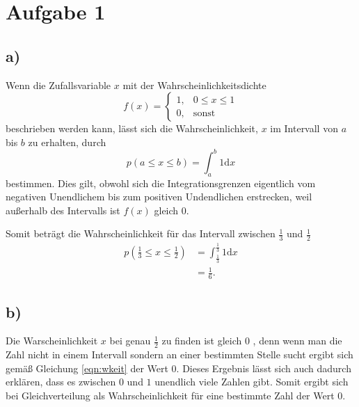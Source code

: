 \newpage
\section{Aufgabe 1}
\label{sec:a1}

\subsection{a)}
\label{subsec:a1a}
Wenn die Zufallsvariable $x$ mit der Wahrscheinlichkeitsdichte
\\
\begin{equation}
  \label{eqn:dichte}
  f\left( x \right) =
  \begin{cases}
     1 , & 0 \le x \le 1 \\
     0 , & \text{sonst}
  \end{cases}
\end{equation}
beschrieben werden kann, lässt sich die Wahrscheinlichkeit, $x$ im Intervall von $a$
bis $b$ zu erhalten, durch
\\
\begin{equation}
  \label{eqn:wkeit}
  p\left( a \le x \le b \right) = \int_{a}^{b} 1 \mathrm{d}x
\end{equation}
bestimmen. Dies gilt, obwohl sich die Integrationsgrenzen eigentlich vom negativen Unendlichem
bis zum positiven Undendlichen erstrecken, weil außerhalb des Intervalls ist $f\left(x\right)$ gleich $0$.


Somit beträgt die Wahrscheinlichkeit für das Intervall zwischen $\frac{1}{3}$ und $\frac{1}{2}$
\\
\begin{align*}
  p\left( \frac{1}{3} \le x \le \frac{1}{2} \right) &= \int_{\frac{1}{3}}^{\frac{1}{3}}
  1 \mathrm{d}x \\
  &= \frac{1}{6}.
\end{align*}

\subsection{b)}
\label{subsec:a1b}
Die Warscheinlichkeit $x$ bei genau $\frac{1}{2}$ zu finden ist gleich $0$ , denn wenn
man die Zahl nicht in einem Intervall sondern an einer bestimmten Stelle
sucht ergibt sich gemäß Gleichung \eqref{eqn:wkeit} der Wert $0$. Dieses Ergebnis lässt sich auch dadurch
erklären, dass es zwischen $0$ und $1$ unendlich viele Zahlen gibt. Somit ergibt sich bei Gleichverteilung
als Wahrscheinlichkeit für eine bestimmte Zahl der Wert $0$.

